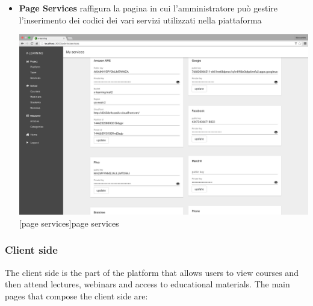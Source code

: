 \begin{itemize}
\item \textbf{Page Services} raffigura la pagina in cui l'amministratore può gestire l'inserimento dei codici dei vari servizi utilizzati nella piattaforma\par

\begin{minipage}{\linewidth}
    \centering
    \includegraphics[width=1.0\linewidth]{images/chapter4/page-services-admin.png}
    [page services]{page services}
\end{minipage}

\end{itemize}


\subsubsection {Client side}
\label{subsec:Client_side}
The client side is the part of the platform that allows users to view courses and then attend lectures, webinars and access to educational materials.
The main pages that compose the client side are:

